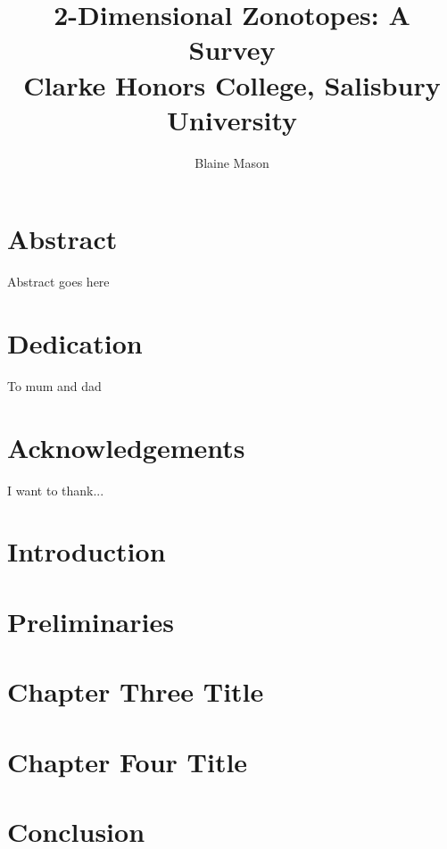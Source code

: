 \documentclass[12pt]{report}
\title{
  {2-Dimensional Zonotopes: A Survey}\\
  {Clarke Honors College, Salisbury University}\\
}
\author{Blaine Mason}
\begin{document}
\maketitle
\chapter*{Abstract}
Abstract goes here

\chapter*{Dedication}
To mum and dad

\chapter*{Acknowledgements}
I want to thank...

\tableofcontents
\chapter{Introduction}


\chapter{Preliminaries}


\chapter{Chapter Three Title}


\chapter{Chapter Four Title}


\chapter{Conclusion}

\end{document}
